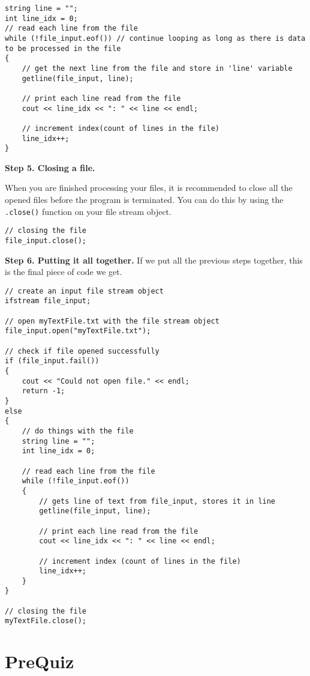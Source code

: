 \begin{verbatim}
string line = "";
int line_idx = 0;
// read each line from the file
while (!file_input.eof()) // continue looping as long as there is data to be processed in the file
{
    // get the next line from the file and store in 'line' variable
    getline(file_input, line);

    // print each line read from the file
    cout << line_idx << ": " << line << endl;

    // increment index(count of lines in the file)
    line_idx++;   
}
\end{verbatim}

\textbf{Step 5. Closing a file.}

When you are finished processing your files, it is recommended to close all the opened files before the program is terminated. You can do this by using the \texttt{.close()} function on your file stream object.

\begin{verbatim}
// closing the file
file_input.close();
\end{verbatim}


\textbf{Step 6. Putting it all together.}
If we put all the previous steps together, this is the final piece of code we get.

\begin{verbatim}
// create an input file stream object
ifstream file_input;

// open myTextFile.txt with the file stream object
file_input.open("myTextFile.txt"); 

// check if file opened successfully
if (file_input.fail())
{
    cout << "Could not open file." << endl;
    return -1;
}
else
{
    // do things with the file
    string line = "";
    int line_idx = 0;

    // read each line from the file
    while (!file_input.eof())
    {
        // gets line of text from file_input, stores it in line
        getline(file_input, line);

        // print each line read from the file
        cout << line_idx << ": " << line << endl;

        // increment index (count of lines in the file)
        line_idx++;   
    }
}

// closing the file
myTextFile.close();
\end{verbatim}

\section{PreQuiz}

